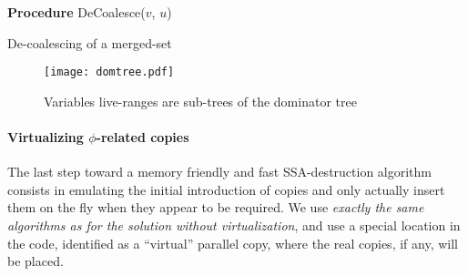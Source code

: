 \begin{algorithm}[h]
\BlankLine
\BlankLine
\BlankLine
\BlankLine
\BlankLine
\textbf{Procedure} \textsf{DeCoalesce}($v$, $u$)\\
\caption{\label{alg:alternative_ssa_destruction:domup} De-coalescing of a merged-set}
\end{algorithm}

\begin{figure}
\texttt{[image: domtree.pdf]}
\caption{\label{fig:alternative_ssa_destruction:fig:domtree}Variables live-ranges are sub-trees of the dominator tree}
\end{figure}


\paragraph{Virtualizing $\phi$-related copies}
The last step toward a memory friendly and fast SSA-destruction algorithm consists in emulating the initial introduction of copies and only actually insert them on the fly when they appear to be required. We use \emph{exactly the same algorithms as for the solution without virtualization}, and use a special location in the code, identified as a ``virtual'' parallel copy, where the real copies, if any, will be placed. 


